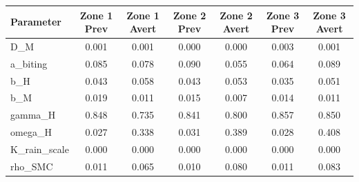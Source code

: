 \begin{tabular}{lcccccc}
\hline
Parameter & Zone 1 Prev & Zone 1 Avert & Zone 2 Prev & Zone 2 Avert & Zone 3 Prev & Zone 3 Avert \\
\hline
D_M & 0.001 & 0.001 & 0.000 & 0.000 & 0.003 & 0.001 \\
a_biting & 0.085 & 0.078 & 0.090 & 0.055 & 0.064 & 0.089 \\
b_H & 0.043 & 0.058 & 0.043 & 0.053 & 0.035 & 0.051 \\
b_M & 0.019 & 0.011 & 0.015 & 0.007 & 0.014 & 0.011 \\
gamma_H & 0.848 & 0.735 & 0.841 & 0.800 & 0.857 & 0.850 \\
omega_H & 0.027 & 0.338 & 0.031 & 0.389 & 0.028 & 0.408 \\
K_rain_scale & 0.000 & 0.000 & 0.000 & 0.000 & 0.000 & 0.000 \\
rho_SMC & 0.011 & 0.065 & 0.010 & 0.080 & 0.011 & 0.083 \\
\hline
\end{tabular}
